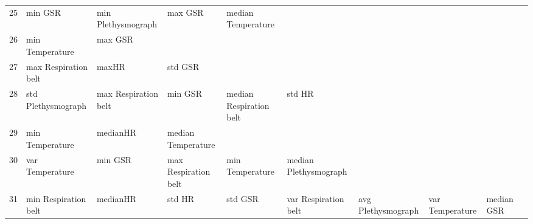 \begin{landscape}
\begin{table}[]
\begin{tabular}{l|llllllll}
25       & min GSR                 & min Plethysmograph      & max GSR                 & median Temperature      &                         &                       &                         &                         &                         &         \\
26       & min Temperature         & max GSR                 &                         &                         &                         &                       &                         &                         &                         &         \\
27       & max Respiration belt    & maxHR                   & std GSR                 &                         &                         &                       &                         &                         &                         &         \\
28       & std Plethysmograph      & max Respiration belt    & min GSR                 & median Respiration belt & std HR                  &                       &                         &                         &                         &         \\
29       & min Temperature         & medianHR                & median Temperature      &                         &                         &                       &                         &                         &                         &         \\
30       & var Temperature         & min GSR                 & max Respiration belt    & min Temperature         & median Plethysmograph   &                       &                         &                         &                         &         \\
31       & min Respiration belt    & medianHR                & std HR                  & std GSR                 & var Respiration belt    & avg Plethysmograph    & var Temperature         & median GSR              &                         &         \\
\end{tabular}
\end{table}
\end{landscape}
\clearpage
